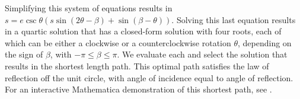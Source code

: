  Simplifying this system of equations results in $s=e \csc \theta (s \sin(2 \theta-\beta)+\sin(\beta-\theta))$. Solving this last equation results in a quartic solution that has a closed-form solution with four roots, each of which can be either a clockwise or a counterclockwise rotation $\theta$, depending on the sign of $\beta$, with $-\pi\leq\beta\leq\pi$. We evaluate each and select the solution that results in the shortest length path. This optimal path satisfies the law of reflection off the unit circle, with angle of incidence equal to angle of reflection. For an interactive Mathematica demonstration of this shortest path, see \cite{BeckerShortestPath}.
 
  
 